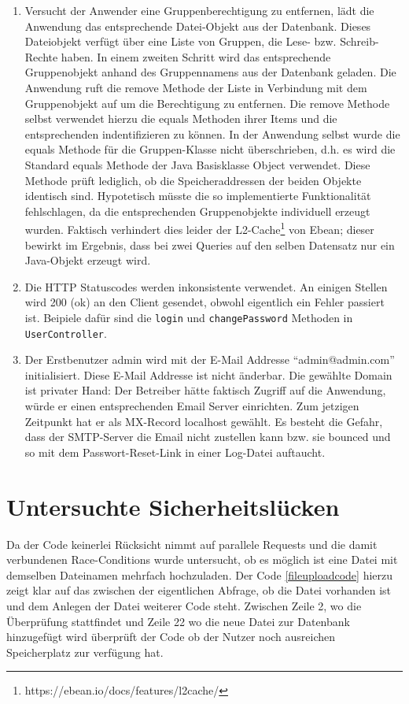 \documentclass[12pt,DIV14,BCOR10mm,a4paper,parskip=half-,headsepline,headinclude,english,ngerman,bibliography=totocnumbered]{scrreprt}
\begin{document}
\begin{enumerate}[resume]
  \item Versucht der Anwender eine Gruppenberechtigung zu entfernen, lädt die Anwendung das entsprechende Datei-Objekt aus der Datenbank. Dieses Dateiobjekt verfügt über eine Liste von Gruppen, die Lese- bzw. Schreib-Rechte haben. In einem zweiten Schritt wird das entsprechende Gruppenobjekt anhand des Gruppennamens aus der Datenbank geladen. Die Anwendung ruft die remove Methode der Liste in Verbindung mit dem Gruppenobjekt auf um die Berechtigung zu entfernen. Die remove Methode selbst verwendet hierzu die equals Methoden ihrer Items und die entsprechenden indentifizieren zu können. In der Anwendung selbst wurde die equals Methode für die Gruppen-Klasse nicht überschrieben, d.h. es wird die Standard equals Methode der Java Basisklasse Object verwendet. Diese Methode prüft lediglich, ob die Speicheraddressen der beiden Objekte identisch sind. Hypotetisch müsste die so implementierte Funktionalität fehlschlagen, da die entsprechenden Gruppenobjekte individuell erzeugt wurden. Faktisch verhindert dies leider der L2-Cache\footnote{https://ebean.io/docs/features/l2cache/} von Ebean; dieser bewirkt im Ergebnis, dass bei zwei Queries auf den selben Datensatz nur ein Java-Objekt erzeugt wird.
  	\item Die HTTP Statuscodes werden inkonsistente verwendet. An einigen Stellen wird 200 (ok) an den Client gesendet, obwohl eigentlich ein Fehler passiert ist. Beipiele dafür sind die \texttt{login} und \texttt{changePassword} Methoden in \texttt{UserController}.
  	\item Der Erstbenutzer admin wird mit der E-Mail Addresse \enquote{admin@admin.com} initialisiert. Diese E-Mail Addresse ist nicht änderbar. Die gewählte Domain ist privater Hand: Der Betreiber hätte faktisch Zugriff auf die Anwendung, würde er einen entsprechenden Email Server einrichten. Zum jetzigen Zeitpunkt hat er als MX-Record localhost gewählt. Es besteht die Gefahr, dass der SMTP-Server die Email nicht zustellen kann bzw. sie bounced und so mit dem Passwort-Reset-Link in einer Log-Datei auftaucht.

\end{enumerate}

\chapter{Untersuchte Sicherheitslücken}
Da der Code keinerlei Rücksicht nimmt auf parallele Requests und die damit verbundenen Race-Conditions wurde untersucht, ob es möglich ist eine Datei mit demselben Dateinamen mehrfach hochzuladen. Der Code \ref{fileuploadcode} hierzu zeigt klar auf das zwischen der eigentlichen Abfrage, ob die Datei vorhanden ist und dem Anlegen der Datei weiterer Code steht. Zwischen Zeile 2, wo die Überprüfung stattfindet und Zeile 22 wo die neue Datei zur Datenbank hinzugefügt wird überprüft der Code ob der Nutzer noch ausreichen Speicherplatz zur verfügung hat.
\end{document}
